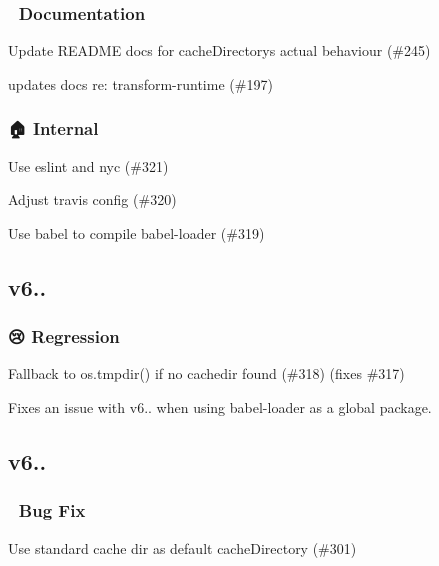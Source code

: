 \subsubsection*{📝 Documentation}


\begin{DoxyItemize}
\item Update R\+E\+A\+D\+ME docs for cache\+Directory\textquotesingle{}s actual behaviour (\#245) 
\item updates docs re\+: transform-\/runtime (\#197) 
\end{DoxyItemize}

\subsubsection*{🏠 Internal}


\begin{DoxyItemize}
\item Use eslint and nyc (\#321) 
\item Adjust travis config (\#320) 
\item Use babel to compile babel-\/loader (\#319) 
\end{DoxyItemize}

\subsection*{v6..}

\subsubsection*{😢 Regression}

Fallback to {\ttfamily os.\+tmpdir()} if no cachedir found (\#318) (fixes \#317) 

Fixes an issue with v6.. when using {\ttfamily babel-\/loader} as a global package.

\subsection*{v6..}

\subsubsection*{🐛 Bug Fix}


\begin{DoxyItemize}
\item Use standard cache dir as default {\ttfamily cache\+Directory} (\#301) 
\end{DoxyItemize}

